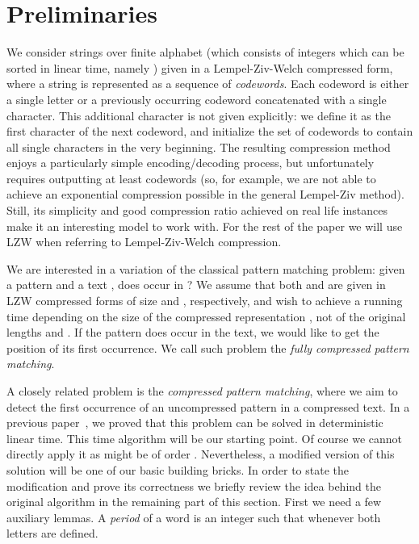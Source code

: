 \documentclass[runningheads]{llncs}
\begin{document}
\section{Preliminaries}

We consider strings over finite alphabet  (which consists of integers which can be sorted in linear time, namely ) given in a Lempel-Ziv-Welch compressed form, where a string is represented as a sequence of {\it codewords}. Each codeword is either a single letter or a previously occurring codeword concatenated with a single character. This additional character is not given explicitly: we define it as the first character of the next codeword, and initialize the set of codewords to contain all single characters in the very beginning. The resulting compression method enjoys a particularly simple encoding/decoding process, but unfortunately requires outputting at least  codewords (so, for example, we are not able to achieve an exponential compression possible in the general Lempel-Ziv method). Still, its simplicity and good compression ratio achieved on real life instances make it an interesting model to work with. For the rest of the paper we will use LZW when referring to Lempel-Ziv-Welch compression.

We are interested in a variation of the classical pattern matching problem: given a pattern  and a text , does  occur in ? We assume that both  and  are given in LZW compressed forms of size  and , respectively, and wish to achieve a running time depending on the size of the compressed representation , not of the original lengths  and . If the pattern does occur in the text, we would like to get the position of its first occurrence. We call such problem the {\it fully compressed pattern matching}.

A closely related problem is the {\it compressed pattern matching}, where we aim to detect the first occurrence of an uncompressed pattern in a compressed text. In a previous paper~\cite{GawrychowskiLZW}, we proved that this problem can be solved in deterministic linear time. This  time algorithm will be our starting point. Of course we cannot directly apply it as  might be of order . Nevertheless, a modified version of this solution will be one of our basic building bricks. In order to state the modification and prove its correctness we briefly review the idea behind the original algorithm in the remaining part of this section. First we need a few auxiliary lemmas. A {\it period} of a word  is an integer  such that  whenever both letters are defined.
\end{document}

